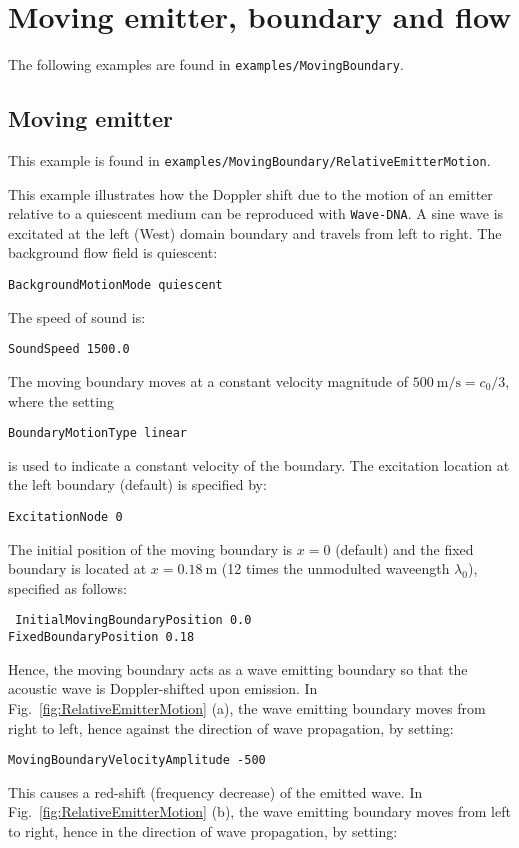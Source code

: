 \section{Moving emitter, boundary and flow}
\label{sec:Moving emitter, boundary and flow}

The following examples are found in {\tt examples/MovingBoundary}.

\subsection{Moving emitter}
\label{sec:Moving emitter}

This example is found in {\tt examples/MovingBoundary/RelativeEmitterMotion}.

This example illustrates how the Doppler shift due to the motion of an emitter relative to a quiescent medium can be reproduced with {\tt Wave-DNA}. A sine wave is excitated at the left (West) domain boundary and travels from left to right. The background flow field is quiescent:

{\tt BackgroundMotionMode quiescent}

The speed of sound is:

{\tt SoundSpeed 1500.0}

The moving boundary moves at a constant velocity magnitude of $500\:\mathrm{m/s}=c_0/3$, where the setting

    {\tt BoundaryMotionType linear}

is used to indicate a constant velocity of the boundary. The excitation location at the left boundary (default) is specified by:

{\tt ExcitationNode 0}

The initial position of the moving boundary is $x=0$ (default) and the fixed boundary is located at $x=0.18\:\mathrm{m}$ (12 times the unmodulted waveength $\lambda_0$), specified as follows:

{\tt
InitialMovingBoundaryPosition 0.0 \\
FixedBoundaryPosition 0.18
}

Hence, the moving boundary acts as a wave emitting boundary so that the acoustic wave is Doppler-shifted upon emission. In Fig.~\ref{fig:RelativeEmitterMotion} (a), the wave emitting boundary moves from right to left, hence against the direction of wave propagation, by setting:

{\tt MovingBoundaryVelocityAmplitude -500}

This causes a red-shift (frequency decrease) of the emitted wave. In Fig.~\ref{fig:RelativeEmitterMotion} (b), the wave emitting boundary moves from left to right, hence in the direction of wave propagation, by setting:

